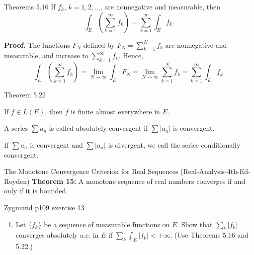 \documentclass[UTF8,a4paper,10pt]{article}
\begin{document}
\begin{mybox}{Theorems 5.16}
  If $f_k$, $k = 1, 2, \ldots$, are nonnegative and measurable, then
\[
  \int_E \left(\sum_{k=1}^{\infty} f_k\right) = \sum_{k=1}^{\infty} \int_E f_k.
\]

\textbf{Proof.}
The functions $F_N$ defined by $F_N = \sum_{k=1}^{N} f_k$ are nonnegative and measurable, and increase to $\sum_{k=1}^{\infty} f_k$. Hence,
\[
  \int_E \left(\sum_{k=1}^{\infty} f_k\right)= \lim_{N \to \infty} \int_E  F_N = \lim_{N \to \infty}\sum_{k=1}^{N} f_k = \sum_{k=1}^{\infty} \int_E f_k.
\]
\end{mybox}

\begin{mybox}{Theorem 5.22}

If $f \in L(E)$, then $f$ is finite almost everywhere in $E$.

\end{mybox}

\begin{mybox}{}
  A series $\sum a_n$ is called absolutely convergent if $\sum |a_n|$ is convergent. 
  
  If $\sum a_n$ is convergent and $\sum |a_n|$ is divergent, we call the series conditionally convergent.

\end{mybox}

\begin{mybox}{The Monotone Convergence Criterion for Real Sequences (Real-Analysis-4th-Ed-Royden)}
  \textbf{Theorem 15:} A monotone sequence of real numbers converges if and only if it is bounded.

\end{mybox}

\begin{Problem}[]{Zygmund p109 exercise 13}
\begin{enumerate}[label=(\alph*)]
  \item Let $\{f_k\}$ be a sequence of measurable functions on $E$. Show that $\sum_{k} |f_k|$ converges absolutely a.e. in $E$ if $\sum_{k} \int_E |f_k| < +\infty$. (Use Theorems 5.16 and 5.22.)

\end{enumerate}
\end{Problem}
\end{document}
